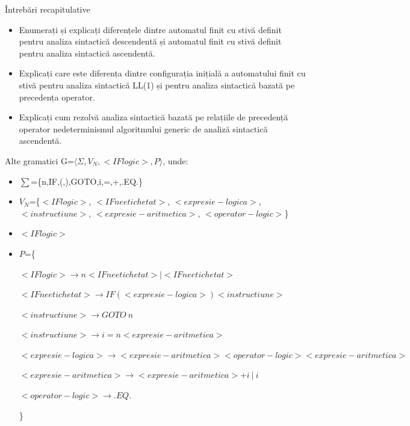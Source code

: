 \documentclass[pdf]{beamer}
\begin{document}
\begin{frame}{Întrebări recapitulative}
\begin{itemize}
\item
Enumerați și explicați diferențele dintre automatul finit cu stivă definit pentru analiza sintactică descendentă și automatul finit cu stivă definit pentru analiza sintactică ascendentă.
\newline

\item
Explicați care este diferența dintre configurația inițială a automatului finit cu stivă pentru analiza sintactică LL(1) și pentru analiza sintactică bazată pe precedența operator.
\newline

\item
Explicați cum rezolvă analiza sintactică bazată pe relațiile de precedență operator nedeterminismul algoritmului generic de analiză sintactică ascendentă.
\newline

\end{itemize}
\end{frame}



\begin{frame}{Alte gramatici}
G=$\langle \Sigma, V_N, <IF logic>, P \rangle$, unde:

\begin{itemize}
\item
$\sum$=\{n,IF,(,),GOTO,i,=,+,.EQ.\}
\item
$V_N$=\{$<IF logic>$, $<IF neetichetat>$, $<expresie-logica>$, $<instructiune>$, $<expresie-aritmetica>$, $<operator-logic>$\}
\item
$<IF logic>$
\item
$P$=\{

$<IF logic> \rightarrow n <IF neetichetat> | <IF neetichetat> $

$<IF neetichetat> \rightarrow IF ( <expresie-logica> ) <instructiune>$

$<instructiune> \rightarrow GOTO \ n $

$<instructiune> \rightarrow i =  n <expresie-aritmetica>$

$<expresie-logica> \rightarrow <expresie-aritmetica> <operator-logic> <expresie-aritmetica>$

$<expresie-aritmetica> \rightarrow <expresie-aritmetica> + i \  | \ i$

$<operator-logic> \rightarrow .EQ.$

\}
\end{itemize}

\end{frame}
\end{document}
